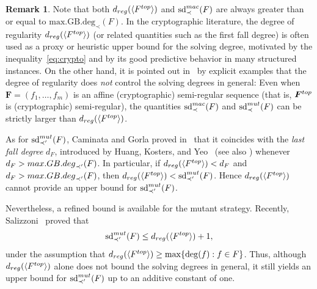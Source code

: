 \documentclass{article}
\theoremstyle{definition}
\newtheorem{remark}[theorem]{Remark}
\theoremstyle{plain}
\theoremstyle{plain}
\theoremstyle{plain}
\theoremstyle{plain}
\numberwithin{equation}{subsection}
\begin{document}
\begin{remark}
Note that both $d_{\rm reg}(\langle F^{\rm top}\rangle)$ and $\mathrm{sd}_{\prec}^{\rm mac}(F)$ are always greater than or equal to $\mathrm{max.GB.deg}_{\prec}(F)$.
In the cryptographic literature, the degree of regularity $d_{\rm reg}(\langle F^{\rm top}\rangle)$ (or related quantities such as the first fall degree) is often used as a proxy or heuristic upper bound for the solving degree, motivated by the inequality~\eqref{eq:crypto} and by its good predictive behavior in many structured instances.
On the other hand, it is pointed out in~\cite{BNDGMT21,CG20,CG23} by explicit examples that the degree of regularity does \emph{not} control the solving degrees in general:
Even when $\bm{F}=(f_1,\ldots,f_m)$ is an affine (cryptographic) semi-regular sequence (that is, $\bm{F}^{\rm top}$ is (cryptographic) semi-regular), the quantities $\mathrm{sd}_{\prec}^{\rm mac}(F)$ and $\mathrm{sd}_{\prec}^{\rm mut}(F)$ can be strictly larger than $d_{\rm reg}(\langle F^{\rm top}\rangle)$.
\end{remark}

As for $\mathrm{sd}_{\prec'}^{\rm mut}(F)$, Caminata and Gorla proved in~\cite{CG23} that it coincides with the \emph{last fall degree} $d_F$, introduced by Huang, Kosters, and Yeo~\cite[Definition 2]{LFD2015} (see also \cite[Definition 2.5]{LFD2018}) whenever $d_F > {\rm max.GB.deg}_{\prec'}(F)$.
In particular, if $d_{\rm reg}(\langle F^{\rm top}\rangle) < d_F$ and $d_F > {\rm max.GB.deg}_{\prec'}(F)$, then $d_{\rm reg}(\langle F^{\rm top}\rangle)<\mathrm{sd}_{\prec'}^{\rm mut}(F)$.
Hence $d_{\rm reg}(\langle F^{\rm top}\rangle)$ cannot provide an upper bound for $\mathrm{sd}_{\prec'}^{\rm mut}(F)$.

Nevertheless, a refined bound is available for the mutant strategy.
Recently, Salizzoni~\cite[Theorem~1.1]{MXLsd} proved that
\[
\mathrm{sd}_{\prec'}^{\rm mut}(F) \le d_{\rm reg}(\langle F^{\rm top}\rangle)+1,
\]
under the assumption that $d_{\rm reg}(\langle F^{\rm top}\rangle)\ge \max\{\deg(f): f\in F\}$.
Thus, although $d_{\rm reg}(\langle F^{\rm top}\rangle)$ alone does not bound the solving degrees in general, it still yields an upper bound for $\mathrm{sd}_{\prec'}^{\rm mut}(F)$ up to an additive constant of one.

\end{document}
